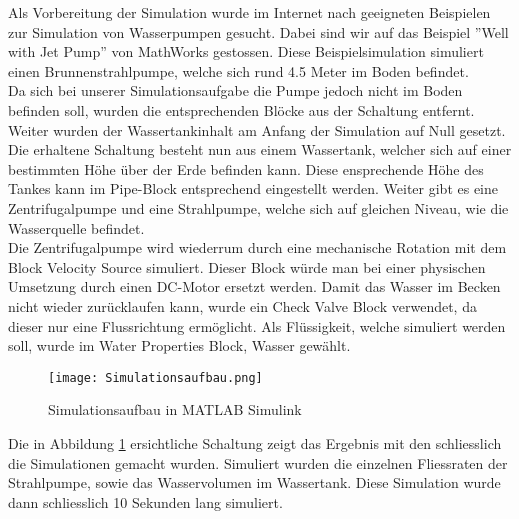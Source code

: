 Als Vorbereitung der Simulation wurde im Internet nach geeigneten Beispielen zur Simulation von Wasserpumpen gesucht. Dabei sind wir auf das Beispiel ''Well with Jet Pump'' \cite{MathWorks_JetPump} von MathWorks gestossen. Diese Beispielsimulation simuliert einen Brunnenstrahlpumpe, welche sich rund 4.5 Meter im Boden befindet.\\

Da sich bei unserer Simulationsaufgabe die Pumpe jedoch nicht im Boden befinden soll, wurden die entsprechenden Blöcke aus der Schaltung entfernt. Weiter wurden der Wassertankinhalt am Anfang der Simulation auf Null gesetzt. Die erhaltene Schaltung besteht nun aus einem Wassertank, welcher sich auf einer bestimmten Höhe über der Erde befinden kann. Diese ensprechende Höhe des Tankes kann im Pipe-Block entsprechend eingestellt werden. Weiter gibt es eine Zentrifugalpumpe und eine Strahlpumpe, welche sich auf gleichen Niveau, wie die Wasserquelle befindet.\\

Die Zentrifugalpumpe wird wiederrum durch eine mechanische Rotation mit dem Block Velocity Source simuliert. Dieser Block würde man bei einer physischen Umsetzung durch einen DC-Motor ersetzt werden. Damit das Wasser im Becken nicht wieder zurücklaufen kann, wurde ein Check Valve Block verwendet, da dieser nur eine Flussrichtung ermöglicht. Als Flüssigkeit, welche simuliert werden soll, wurde im Water Properties Block, Wasser gewählt.\\

\begin{figure}[htb]
\texttt{[image: Simulationsaufbau.png]}
\caption{Simulationsaufbau in MATLAB Simulink}
\label{fig:Simulationsaufbau in MATLAB Simulink}
\end{figure}

Die in Abbildung \ref{fig:Simulationsaufbau in MATLAB Simulink} ersichtliche Schaltung zeigt das Ergebnis mit den schliesslich die Simulationen gemacht wurden. Simuliert wurden die einzelnen Fliessraten der Strahlpumpe, sowie das Wasservolumen im Wassertank. Diese Simulation wurde dann schliesslich 10 Sekunden lang simuliert.